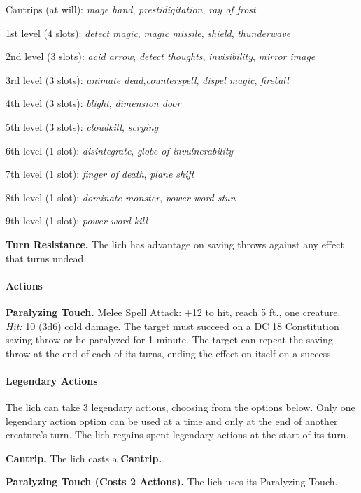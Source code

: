 \documentclass[
]{article}
\begin{document}
Cantrips (at will): \emph{mage hand}, \emph{prestidigitation}, \emph{ray
of frost}

1st level (4 slots): \emph{detect magic}, \emph{magic missile},
\emph{shield}, \emph{thunderwave}

2nd level (3 slots): \emph{acid arrow}, \emph{detect thoughts},
\emph{invisibility}, \emph{mirror image}

3rd level (3 slots): \emph{animate dead},\emph{counterspell},
\emph{dispel magic}, \emph{fireball}

4th level (3 slots): \emph{blight}, \emph{dimension door}

5th level (3 slots): \emph{cloudkill}, \emph{scrying}

6th level (1 slot): \emph{disintegrate}, \emph{globe of invulnerability}

7th level (1 slot): \emph{finger of death}, \emph{plane shift}

8th level (1 slot): \emph{dominate monster}, \emph{power word stun}

9th level (1 slot): \emph{power word kill}

\textbf{Turn Resistance.} The lich has advantage on saving throws
against any effect that turns undead.

\hypertarget{actions-1}{%
\paragraph{Actions}\label{actions-1}}

\textbf{Paralyzing Touch.} Melee Spell Attack: +12 to hit, reach 5 ft.,
one creature. \emph{Hit:} 10 (3d6) cold damage. The target must succeed
on a DC 18 Constitution saving throw or be paralyzed for 1 minute. The
target can repeat the saving throw at the end of each of its turns,
ending the effect on itself on a success.

\hypertarget{legendary-actions}{%
\paragraph{Legendary Actions}\label{legendary-actions}}

The lich can take 3 legendary actions, choosing from the options below.
Only one legendary action option can be used at a time and only at the
end of another creature's turn. The lich regains spent legendary actions
at the start of its turn.

\textbf{Cantrip.} The lich casts a \textbf{Cantrip.}

\textbf{Paralyzing Touch (Costs 2 Actions).} The lich uses its
Paralyzing Touch.
\end{document}
